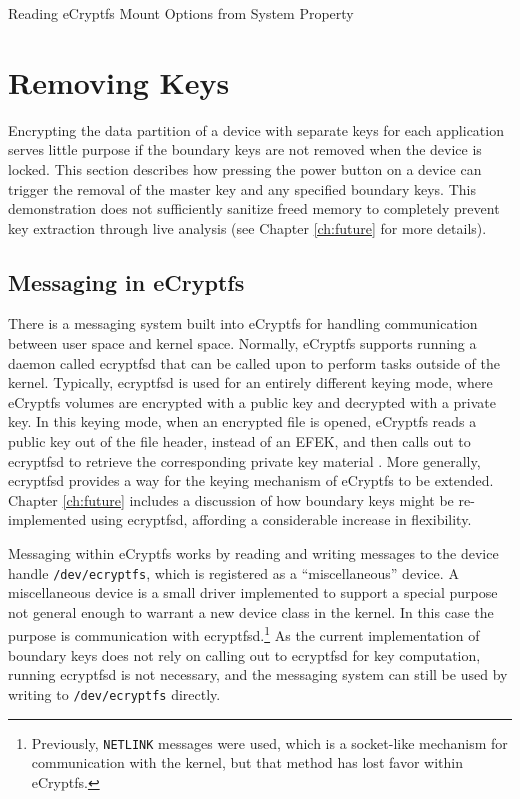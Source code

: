 \begin{table}[!htb] 

\caption{Reading eCryptfs Mount Options from System Property} 
\label{tab:init-ecryptfs-mount}
\end{table}

\section{Removing Keys}

Encrypting the data partition of a device with separate keys for each application serves little purpose if the
boundary keys are not removed when the device is locked. This section describes how pressing the power button on a device can
trigger the removal of the master key and any specified boundary keys. This demonstration does not sufficiently sanitize freed
memory to completely prevent key extraction through live analysis (see Chapter \ref{ch:future} for more details).

\subsection{Messaging in eCryptfs}
 
There is a messaging system built into eCryptfs for handling communication between user space and kernel space. Normally, eCryptfs
supports running a daemon called ecryptfsd that can be called upon to perform tasks outside of the kernel.  Typically,
ecryptfsd is used for an entirely different keying mode, where eCryptfs volumes are encrypted with a public key and
decrypted with a private key.  In this keying mode, when an encrypted file is opened, eCryptfs reads a public key out of the file
header, instead of an EFEK, and then calls out to ecryptfsd to retrieve the corresponding private key material \cite{ecryptfspki}. More
generally, ecryptfsd provides a way for the keying mechanism of eCryptfs to be extended.  Chapter \ref{ch:future} includes
a discussion of how boundary keys might be re-implemented using ecryptfsd, affording a considerable increase in
flexibility.

Messaging within eCryptfs works by reading and writing messages to the device handle \texttt{/dev/ecryptfs}, which is registered as
a ``miscellaneous'' device. A miscellaneous device is a small driver implemented to support a special purpose not general enough to
warrant a new device class in the kernel. In this case the purpose is communication with ecryptfsd.\footnote{Previously,
\texttt{NETLINK} messages were used, which is a socket-like mechanism for communication with the kernel, but that method has lost
favor within eCryptfs.} As the current implementation of boundary keys does not rely on calling out to ecryptfsd for key
computation, running ecryptfsd is not necessary, and the messaging system can still be used by writing to
\texttt{/dev/ecryptfs} directly. 


